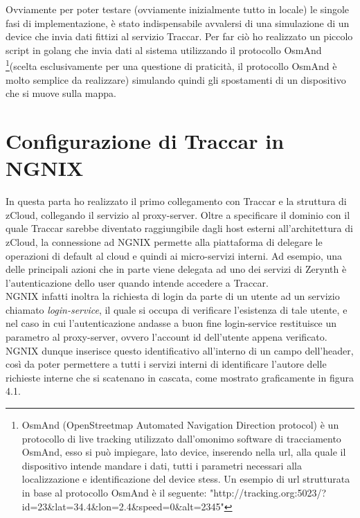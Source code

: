 \documentclass[a4paper,titlepage,12pt]{report}
\begin{document}
{Ovviamente per poter testare (ovviamente inizialmente tutto in locale) le singole fasi di implementazione, è stato indispensabile avvalersi di una simulazione di un device che invia dati fittizi al servizio Traccar. Per far ciò ho realizzato un piccolo script in golang che invia dati al sistema utilizzando il protocollo OsmAnd \footnote{OsmAnd (OpenStreetmap Automated Navigation Direction protocol) è un protocollo di live tracking utilizzato dall'omonimo software di tracciamento OsmAnd, esso si può impiegare, lato device, inserendo nella url, alla quale il dispositivo intende mandare i dati, tutti i parametri necessari alla localizzazione e identificazione del device stess. Un esempio di url strutturata in base al protocollo OsmAnd è il seguente: "http://tracking.org:5023/?id=23\&lat=34.4\&lon=2.4\&speed=0\&alt=2345"}(scelta esclusivamente per una questione di praticità, il protocollo OsmAnd è molto semplice da realizzare) simulando quindi gli spostamenti di un dispositivo che si muove sulla mappa.

\section{
Configurazione di Traccar in NGNIX}
In questa parta ho realizzato il primo collegamento con Traccar e la struttura di zCloud, collegando il servizio al proxy-server. Oltre a specificare il dominio con il quale Traccar sarebbe diventato raggiungibile dagli host esterni all'architettura di zCloud, la connessione ad NGNIX permette alla piattaforma di delegare le operazioni di default al cloud e quindi ai micro-servizi interni. Ad esempio, una delle principali azioni che in parte viene delegata ad uno dei servizi di Zerynth è l'autenticazione dello user quando intende accedere a Traccar. \\
NGNIX infatti inoltra la richiesta di login da parte di un utente ad un servizio chiamato \textit{login-service}, il quale si occupa di verificare l'esistenza di tale utente, e nel caso in cui l'autenticazione andasse a buon fine login-service restituisce un parametro al proxy-server, ovvero l'account id dell'utente appena verificato. NGNIX dunque inserisce questo identificativo all'interno di un campo dell'header, così da poter permettere a tutti i servizi interni di identificare l'autore delle richieste interne che si scatenano in cascata, come mostrato graficamente in figura 4.1.

}
\end{document}
